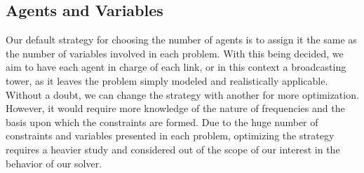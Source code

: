 \documentclass{article}
\begin{document}
	\subsection{Agents and Variables}
	Our default strategy for choosing the number of agents is to assign it the same as the number of variables involved in each problem. With this being decided, we aim to have each agent in charge of each link, or in this context a broadcasting tower, as it leaves the problem simply modeled and realistically applicable. Without a doubt, we can change the strategy with another for more optimization. However, it would require more knowledge of the nature of frequencies and the basis upon which the constraints are formed. Due to the huge number of constraints and variables presented in each problem, optimizing the strategy requires a heavier study and considered out of the scope of our interest in the behavior of our solver. 
	
\end{document}
